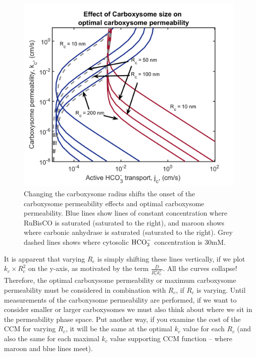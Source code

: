 \documentclass[]{article}
\begin{document}
\begin{figure}
	\includegraphics[width = \textwidth]{Rc_jcvskc.png}
	\caption{Changing the carboxysome radius shifts the onset of the carboxysome permeability effects and optimal carboxysome permeability. Blue lines show lines of constant concentration where  RuBisCO is saturated (saturated to the right), and maroon shows where carbonic anhydrase is saturated  (saturated to the right). Grey dashed lines shows where cytosolic ${\rm HCO_3^-}$ concentration is 30mM.}
\end{figure}
It is apparent that varying $R_c$ is simply shifting these lines vertically, if we plot $k_c \times R_c^2$ on the y-axis, as motivated by the term $\frac{D}{R_c^2 k_c^C}$. All the curves collapse! Therefore, the optimal carboxysome permeability or maximum carboxysome permeability must be considered in combination with $R_c$, if $R_c$ is varying. Until measurements of the carboxysome permeability are performed, if we want to consider smaller or larger carboxysomes we must also think about where we sit in the permeability phase space. Put another way, if you examine the cost of the CCM for varying $R_c$, it will be the same at the optimal $k_c$ value for each $R_c$ (and also the same for each maximal $k_c$ value supporting CCM function -- where maroon and blue lines meet).
\end{document}
